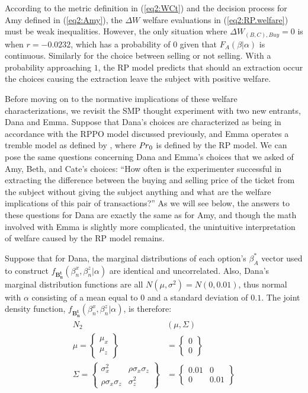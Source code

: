 \documentclass[../main.tex]{subfiles}
\begin{document}
According to the metric definition in (\ref{eq2:WCt}) and the decision process for Amy defined in (\ref{eq2:Amy}), the $\Delta W$ welfare evaluations in (\ref{eq2:RP.welfare}) must be weak inequalities.
However, the only situation where $\Delta W_{(B,C),\mathit{Buy}} = 0$ is when $r=-0.0232$, which has a probability of $0$ given that $F_A(\beta|\alpha)$ is continuous.
Similarly for the choice between selling or not selling.
With a probability approaching $1$, the RP model predicts that should an extraction occur the choices causing the extraction leave the subject with positive welfare.

Before moving on to the normative implications of these welfare characterizations, we revisit the SMP thought experiment with two new entrants, Dana and Emma.
Suppose that Dana's choices are characterized as being in accordance with the RPPO model discussed previously, and Emma operates a tremble model as defined by \textcite{Loomes2002}, where $ {\mathit{Pr}}_0$ is defined by the RP model.
We can pose the same questions concerning Dana and Emma's choices that we asked of Amy, Beth, and Cate's choices: \enquote{How often is the experimenter successful in extracting the difference between the buying and selling price of the ticket from the subject without giving the subject anything and what are the welfare implications of this pair of transactions?}
As we will see below, the answers to these questions for Dana are exactly the same as for Amy, and though the math involved with Emma is slightly more complicated, the unintuitive interpretation of welfare caused by the RP model remains.

Suppose that for Dana, the marginal distributions of each option's $\beta_A^*$ vector used to construct $f_{\mathbf{B_n^t}}(\beta_n^ x,\beta_n^ z|\alpha)$ are identical and uncorrelated.{\footnotemark}
Also, Dana's marginal distribution functions are all $N(\mu,\sigma^2) = N(0,0.01)$, thus normal with $\alpha$ consisting of a mean equal to $0$ and a standard deviation of $0.1$.
The joint density function, $f_{\mathbf{B_n^t}}(\beta_n^x,\beta_n^z|\alpha)$, is therefore:
\begin{align}
	\begin{split}
		N_2&(\mu,\Sigma) \\
		\mu =\begin{Bmatrix}\mu_x \\ \mu_z\end{Bmatrix} &= \begin{Bmatrix}0\\0\end{Bmatrix}\\
		\Sigma =\begin{Bmatrix} \sigma_x^2 & \rho\sigma_x\sigma_z \\  \rho\sigma_x\sigma_z & \sigma_z^2 \end{Bmatrix} &=
	\begin{Bmatrix} 0.01 & 0 \\  0 & 0.01 \end{Bmatrix}
	\end{split}
\end{align}
\end{document}
